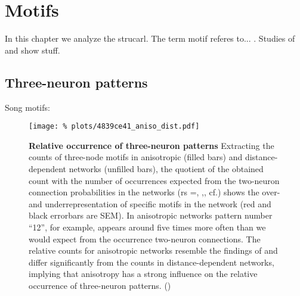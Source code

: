 

\section{Motifs}

In this chapter we analyze the strucarl. The term motif referes
to... . Studies of \textcite{Song2005} and \textcite{Perin2011} show
stuff.

\subsection*{Three-neuron patterns}

Song motifs:


\begin{figure}[H]
  \centering
  \texttt{[image: \%
    plots/4839ce41\_aniso\_dist.pdf]} 
  \captionsetup{skip=8pt}
  \caption{\textbf{Relative occurrence of three-neuron patterns}
    Extracting the counts of three-node motifs in anisotropic (filled
    bars) and distance-dependent networks (unfilled bars), the
    quotient of the obtained count with the number of occurrences
    expected from the two-neuron connection probabilities in the
    networks (rs =, ,, cf.) shows the over- and underrepresentation of
    specific motifs in the network (red and black errorbars are
    SEM). In anisotropic networks pattern number \enquote{12}, for
    example, appears around five times more often than we would expect
    from the occurrence two-neuron connections. The relative counts
    for anisotropic networks resemble the findings of
    \textcite{Song2005} and differ significantly from the counts in
    distance-dependent networks, implying that anisotropy has a strong
    influence on the relative occurrence of three-neuron
    patterns. () }
  \label{fig:distance_theory_compare}
\end{figure}



